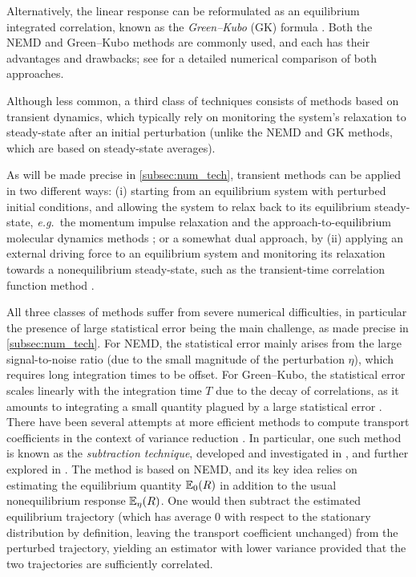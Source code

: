 Alternatively, the linear response can be reformulated as an equilibrium integrated correlation, known as the \emph{Green--Kubo} (GK) formula \cite{green,kubo}. Both the NEMD and Green--Kubo methods are commonly used, and each has their advantages and drawbacks; see \cite{mcqmc_stoltz2022} for a detailed numerical comparison of both approaches. 

Although less common, a third class of techniques consists of methods based on transient dynamics, which typically rely on monitoring the system's relaxation to steady-state after an initial perturbation (unlike the NEMD and GK methods, which are based on steady-state averages). 

As will be made precise in \cref{subsec:num_tech}, transient methods can be applied in two different ways: (i) starting from an equilibrium system with perturbed initial conditions, and allowing the system to relax back to its equilibrium steady-state, \emph{e.g.}\ the momentum impulse relaxation \cite{MIR2000} and the approach-to-equilibrium molecular dynamics methods \cite{AEMD2013}; or a somewhat dual approach, by (ii) applying an external driving force to an equilibrium system and monitoring its relaxation towards a nonequilibrium steady-state, such as the transient-time correlation function method \cite{TTCF1987,TTCF1988}.

All three classes of methods suffer from severe numerical difficulties, in particular the presence of large statistical error being the main challenge, as made precise in \cref{subsec:num_tech}. For NEMD, the statistical error mainly arises from the large signal-to-noise ratio (due to the small magnitude of the perturbation $\eta$), which requires long integration times to be offset. For Green--Kubo, the statistical error scales linearly with the integration time $T$ due to the decay of correlations, as it amounts to integrating a small quantity plagued by a large statistical error \cite{oliveira2017}.
%
There have been several attempts at more efficient methods to compute transport coefficients in the context of variance reduction \cite{mobility_urbain,synthetic2023,noe_fixing_flux}. In particular, one such method is known as the \emph{subtraction technique}, developed and investigated in \cite{ciccotti75}, and further explored in \cite{ciccotti79}. The method is based on NEMD, and its key idea relies on estimating the equilibrium quantity $\mathbb{E}_0(R)$ in addition to the usual nonequilibrium response $\mathbb{E}_\eta(R)$. One would then subtract the estimated equilibrium trajectory (which has average 0 with respect to the stationary distribution by definition, leaving the transport coefficient unchanged) from the perturbed trajectory, yielding an estimator with lower variance provided that the two trajectories are sufficiently correlated.

